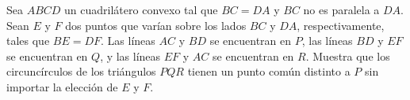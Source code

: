 Sea $ABCD$ un cuadrilátero convexo tal que $BC=DA$ y $BC$ no es paralela a $DA$. Sean $E$ y $F$ dos puntos que varían sobre los lados $BC$ y $DA$, respectivamente, tales que $BE=DF$. Las líneas $AC$ y $BD$ se encuentran en $P$, las líneas $BD$ y $EF$ se encuentran en $Q$, y las líneas $EF$ y $AC$ se encuentran en $R$. Muestra que los circuncírculos de los triángulos $PQR$ tienen un punto común distinto a $P$ sin importar la elección de $E$ y $F$.